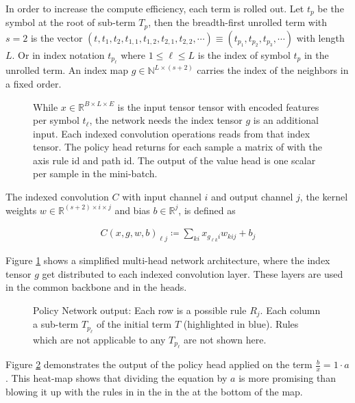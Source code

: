 \documentclass{scrartcl}
\theoremstyle{definition}
\begin{document}
In order to increase the compute efficiency, each term is rolled out.
Let $t_p$ be the symbol at the root of sub-term $T_p$,
then the breadth-first unrolled term with $s=2$ is the vector $\left( t, t_1, t_2, t_{1,1},t_{1,2}, t_{2,1}, t_{2,2}, \cdots \right) \equiv  \left( t_{p_1}, t_{p_2}, t_{p_3},\cdots \right)$ with length $L$.
Or in index notation $t_{p_\ell}$ where $1 \leq \ell \leq L$ is the index of symbol $t_p$ in the unrolled term.
An index map $g \in \mathbb{N}^{L\times \left( s+2 \right)}$ carries the index of the neighbors in a fixed order.



\begin{figure}[!htbp]
	\centering
	
	\caption{While $x\in \mathbb{R}^{B\times L\times E}$ is the input tensor tensor with encoded features per symbol $t_\ell$, the network needs the index tensor $g$ is an additional input.
		Each indexed convolution operations reads from that index tensor.
		The policy head returns for each sample a matrix of with the axis rule id and path id. 
		The output of the value head is one scalar per sample in the mini-batch. 
	}
	\label{fig:iconv_network}
\end{figure}

The indexed convolution $C$ with input channel $i$ and output channel $j$, the kernel weights $w \in \mathbb{R}^{\left( s+2 \right)\times i \times j}$ and bias $b \in \mathbb{R}^j$,
is defined as

\begin{align}
	C\left( x, g, w, b \right)_{\ell j} \coloneqq \sum_{ki}x_{g_{\ell k}i} w_{kij}+b_j
\end{align}

 Figure \ref{fig:iconv_network} shows a simplified multi-head network architecture, where the index tensor $g$ get distributed to each indexed convolution layer.
 These layers are used in the common backbone and in the heads.


\begin{figure}[!htbp]
	\centering
	
	\caption{Policy Network output: Each row is a possible rule $R_j$. Each column a sub-term $T_{p_\ell}$ of the initial term $T$ (highlighted in blue).
	Rules which are not applicable to any $T_{p_\ell}$ are not shown here.
	}
	\label{fig:network_output}
\end{figure}

Figure \ref{fig:network_output} demonstrates the output of the policy head applied on the term $\frac{b}{x}=1\cdot a$.
This heat-map shows that dividing the equation by $a$ is more promising than blowing it up with the rules in in the in the at the bottom of the map.
\end{document}
